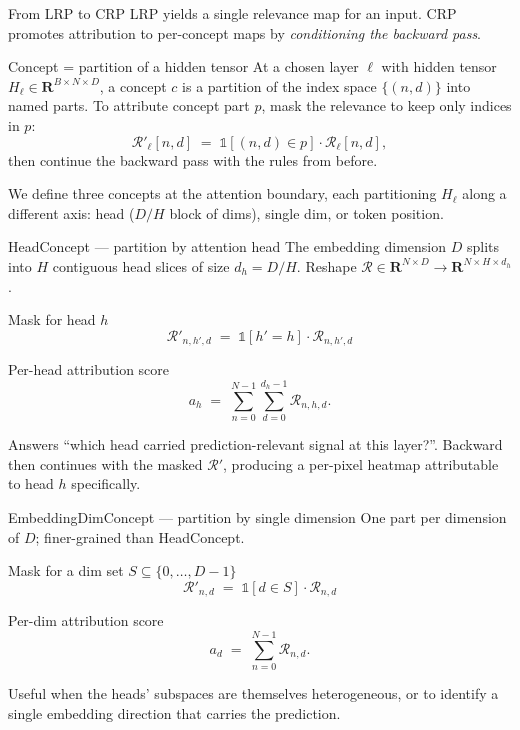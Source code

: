 \documentclass[
  aspectratio=169,
]{beamer}
\newcommand{\Rel}{\mathcal{R}}
\newcommand{\reals}{\mathbf{R}}
\begin{document}
\begin{frame}{From LRP to CRP}
LRP yields a single relevance map for an input. CRP
\cite{achtibat2023crp} promotes attribution to per-concept maps by
\emph{conditioning the backward pass}.

\begin{block}{Concept = partition of a hidden tensor}
At a chosen layer $\ell$ with hidden tensor $H_\ell \in \reals^{B \times N \times D}$,
a concept $c$ is a partition of the index space $\{(n, d)\}$ into
named parts. To attribute concept part $p$, mask the relevance to keep
only indices in $p$:
\[
  \Rel'_\ell[n,d] \;=\; \mathbb{1}[(n,d) \in p] \cdot \Rel_\ell[n,d],
\]
then continue the backward pass with the rules from before.
\end{block}

We define three concepts at the attention boundary, each partitioning
$H_\ell$ along a different axis: head ($D / H$ block of dims), single
dim, or token position.
\end{frame}

\begin{frame}{HeadConcept — partition by attention head}
The embedding dimension $D$ splits into $H$ contiguous head slices of
size $d_h = D/H$. Reshape
$\Rel \in \reals^{N \times D} \to \reals^{N \times H \times d_h}$.

\begin{block}{Mask for head $h$}
\[
  \Rel'_{n, h', d} \;=\; \mathbb{1}[h' = h] \cdot \Rel_{n, h', d}
\]
\end{block}

\begin{block}{Per-head attribution score}
\[
  a_h \;=\; \sum_{n=0}^{N-1} \sum_{d=0}^{d_h - 1} \Rel_{n, h, d}.
\]
\end{block}

Answers ``which head carried prediction-relevant signal at this
layer?''. Backward then continues with the masked $\Rel'$, producing
a per-pixel heatmap attributable to head $h$ specifically.
\end{frame}

\begin{frame}{EmbeddingDimConcept — partition by single dimension}
One part per dimension of $D$; finer-grained than HeadConcept.

\begin{block}{Mask for a dim set $S \subseteq \{0,\ldots,D-1\}$}
\[
  \Rel'_{n, d} \;=\; \mathbb{1}[d \in S] \cdot \Rel_{n, d}
\]
\end{block}

\begin{block}{Per-dim attribution score}
\[
  a_d \;=\; \sum_{n=0}^{N-1} \Rel_{n, d}.
\]
\end{block}

Useful when the heads' subspaces are themselves heterogeneous, or
to identify a single embedding direction that carries the prediction.
\end{frame}
\end{document}
